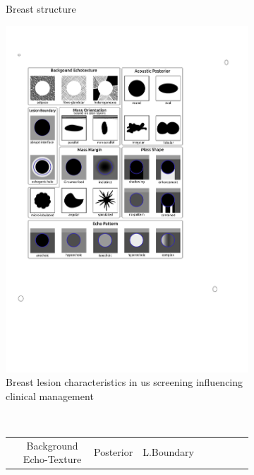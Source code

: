 \begin{figure}
\begin{subfigure}[b]{0.28\textwidth}
        \caption{{\small Breast structure}}    
        \label{fig:features:breast}
    \end{subfigure}
    \hfill
    \begin{subfigure}[b]{0.4\textwidth}   
        \centering 
        \includegraphics[trim = 65 345 200 124, clip,width=\textwidth]{birads}
        \caption[]%
        {Breast lesion characteristics in \ac{us} screening influencing clinical management~\cite{raza2010us}}    
        \label{fig:features:lexicon}
    \end{subfigure}
    \\
    \begin{subfigure}[b]{\textwidth}
      \centering
      \begin{tabular}{lcccccccc}
                  &Background Echo-Texture  
                  &Posterior  %
                  &L.Boundary %

\end{tabular}
\end{subfigure}
\end{figure}
